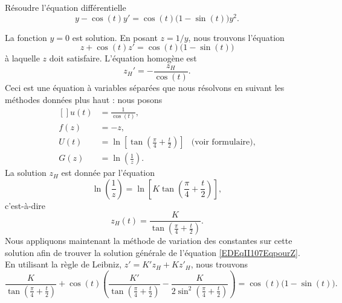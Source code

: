 \begin{example} \label{ExYCPtxgZ}
	Résoudre l'équation différentielle
	\begin{equation}
		y-\cos(t)y'=\cos(t)\big(1-\sin(t)\big)y^2.
	\end{equation}

	La fonction \( y=0\) est solution. En posant \( z=1/y\), nous trouvons l'équation
	\begin{equation}		\label{EDEqII107EqpourZ}
		z+\cos(t)z'=\cos(t)\big(1-\sin(t)\big)
	\end{equation}
	à laquelle \( z\) doit satisfaire. L'équation homogène est
	\begin{equation}
		z_H'=-\frac{ z_H }{ \cos(t) }.
	\end{equation}
	Ceci est une équation à variables séparées que nous résolvons en suivant les méthodes données plus haut : nous posons
	\begin{equation}		\label{EqEDufUGII107}
		\begin{aligned}[]
			u(t) & =\frac{1}{ \cos(t) },                                                                               \\
			f(z) & =-z,                                                                                                \\
			U(t) & =\ln\left[ \tan\left( \frac{ \pi }{ 4 }+\frac{ t }{ 2 } \right) \right] & \text{(voir formulaire)}, \\
			G(z) & =\ln\left( \frac{1}{ z } \right).
		\end{aligned}
	\end{equation}
	La solution \( z_H\) est donnée par l'équation
	\begin{equation}
		\ln\left( \frac{1}{ z } \right)=\ln\left[ K\tan\left( \frac{ \pi }{ 4 }+\frac{ t }{ 2 } \right) \right],
	\end{equation}
	c'est-à-dire
	\begin{equation}
		z_H(t)=\frac{ K }{ \tan\left( \frac{ \pi }{ 4 }+\frac{ t }{ 2 } \right) }.
	\end{equation}
	Nous appliquons maintenant la méthode de variation des constantes sur cette solution afin de trouver la solution générale de l'équation \eqref{EDEqII107EqpourZ}. En utilisant la règle de Leibniz, \( z'=K'z_H+Kz'_H\), nous trouvons
	\begin{equation}
		\frac{ K }{ \tan\left( \frac{ \pi }{ 4 }+\frac{ t }{ 2 } \right) }+\cos(t)\left( \frac{ K' }{  \tan\left( \frac{ \pi }{ 4 }+\frac{ t }{ 2 } \right) }-\frac{ K }{ 2\sin^2 \left( \frac{ \pi }{ 4 }+\frac{ t }{ 2 } \right)  } \right)=\cos(t)\big( 1-\sin(t) \big).

\end{equation}
\end{example}
